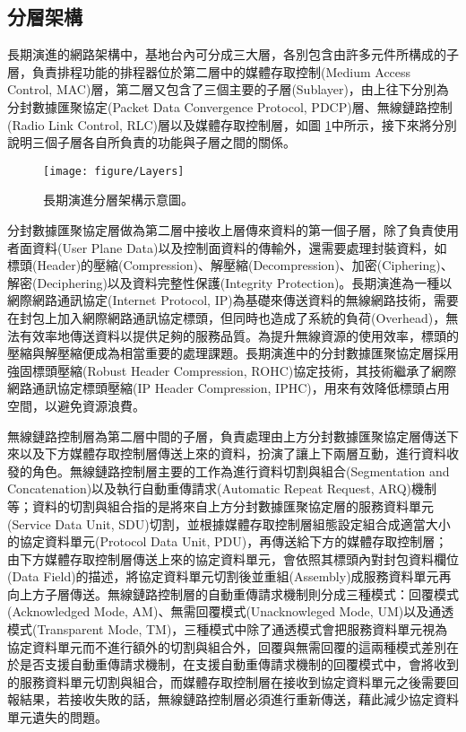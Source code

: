 \subsection{分層架構}
長期演進的網路架構中，基地台內可分成三大層，各別包含由許多元件所構成的子層，負責排程功能的排程器位於第二層中的媒體存取控制(Medium Access Control, MAC)層，第二層又包含了三個主要的子層(Sublayer)，由上往下分別為分封數據匯聚協定(Packet Data Convergence Protocol, PDCP)層、無線鏈路控制(Radio Link Control, RLC)層以及媒體存取控制層，如圖 \ref{fig:Layers}中所示，接下來將分別說明三個子層各自所負責的功能與子層之間的關係。

\vskip 20pt
\begin{figure}[H]
\centering
\texttt{[image: figure/Layers]}
\caption{\label{fig:Layers}長期演進分層架構示意圖。}
\end{figure}


分封數據匯聚協定\cite{PDCP_spec}層做為第二層中接收上層傳來資料的第一個子層，除了負責使用者面資料(User Plane Data)以及控制面資料的傳輸外，還需要處理封裝資料，如標頭(Header)的壓縮(Compression)、解壓縮(Decompression)、加密(Ciphering)、解密(Deciphering)以及資料完整性保護(Integrity Protection)。長期演進為一種以網際網路通訊協定(Internet Protocol, IP)為基礎來傳送資料的無線網路技術，需要在封包上加入網際網路通訊協定標頭，但同時也造成了系統的負荷(Overhead)，無法有效率地傳送資料以提供足夠的服務品質。為提升無線資源的使用效率，標頭的壓縮與解壓縮便成為相當重要的處理課題。長期演進中的分封數據匯聚協定層採用強固標頭壓縮(Robust Header Compression, ROHC)協定技術，其技術繼承了網際網路通訊協定標頭壓縮(IP Header Compression, IPHC)，用來有效降低標頭占用空間，以避免資源浪費。

無線鏈路控制\cite{RLC_spec}層為第二層中間的子層，負責處理由上方分封數據匯聚協定層傳送下來以及下方媒體存取控制層傳送上來的資料，扮演了讓上下兩層互動，進行資料收發的角色。無線鏈路控制層主要的工作為進行資料切割與組合(Segmentation and Concatenation)以及執行自動重傳請求(Automatic Repeat Request, ARQ)機制等；資料的切割與組合指的是將來自上方分封數據匯聚協定層的服務資料單元(Service Data Unit, SDU)切割，並根據媒體存取控制層組態設定組合成適當大小的協定資料單元(Protocol Data Unit, PDU)，再傳送給下方的媒體存取控制層；由下方媒體存取控制層傳送上來的協定資料單元，會依照其標頭內對封包資料欄位(Data Field)的描述，將協定資料單元切割後並重組(Assembly)成服務資料單元再向上方子層傳送。無線鏈路控制層的自動重傳請求機制則分成三種模式：回覆模式(Acknowledged Mode, AM)、無需回覆模式(Unacknowleged Mode, UM)以及通透模式(Transparent Mode, TM)，三種模式中除了通透模式會把服務資料單元視為協定資料單元而不進行額外的切割與組合外，回覆與無需回覆的這兩種模式差別在於是否支援自動重傳請求機制，在支援自動重傳請求機制的回覆模式中，會將收到的服務資料單元切割與組合，而媒體存取控制層在接收到協定資料單元之後需要回報結果，若接收失敗的話，無線鏈路控制層必須進行重新傳送，藉此減少協定資料單元遺失的問題。

